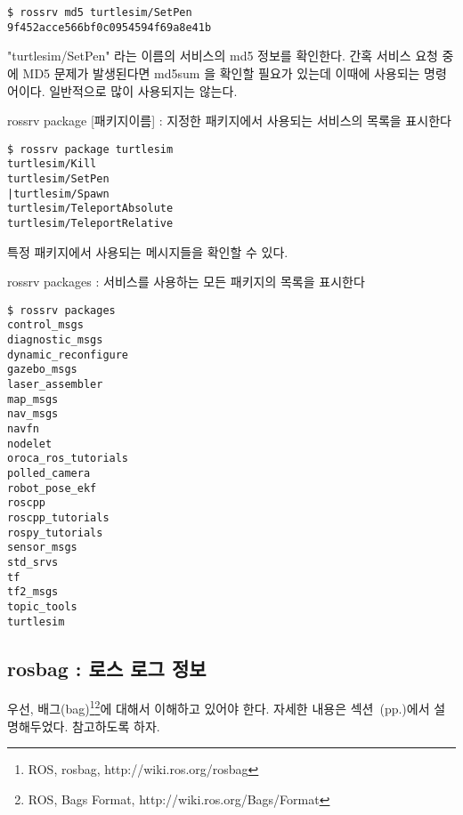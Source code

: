 \begin{lstlisting}[language=ROS]
$ rossrv md5 turtlesim/SetPen 
9f452acce566bf0c0954594f69a8e41b
\end{lstlisting}

\noindent
"turtlesim/SetPen" 라는 이름의 서비스의 md5 정보를 확인한다. 간혹 서비스 요청 중에 MD5 문제가 발생된다면 md5sum 을 확인할 필요가 있는데 이때에 사용되는 명령어이다. 일반적으로 많이 사용되지는 않는다.

\vspace{\baselineskip}
\noindent
{}\circled{\thenum} rossrv package [패키지이름] : 지정한 패키지에서 사용되는 서비스의 목록을 표시한다

\begin{lstlisting}[language=ROS]
$ rossrv package turtlesim 
turtlesim/Kill
turtlesim/SetPen
|turtlesim/Spawn
turtlesim/TeleportAbsolute
turtlesim/TeleportRelative
\end{lstlisting}

\noindent
특정 패키지에서 사용되는 메시지들을 확인할 수 있다.

\vspace{\baselineskip}
\noindent
{}\circled{\thenum} rossrv packages : 서비스를 사용하는 모든 패키지의 목록을 표시한다

\begin{lstlisting}[language=ROS]
$ rossrv packages
control_msgs
diagnostic_msgs
dynamic_reconfigure
gazebo_msgs
laser_assembler
map_msgs
nav_msgs
navfn
nodelet
oroca_ros_tutorials
polled_camera
robot_pose_ekf
roscpp
roscpp_tutorials
rospy_tutorials
sensor_msgs
std_srvs
tf
tf2_msgs
topic_tools
turtlesim
\end{lstlisting}

\subsection{rosbag : 로스 로그 정보}

우선, 배그(bag)\footnote{ROS, rosbag, http://wiki.ros.org/rosbag}\footnote{ROS, Bags Format, http://wiki.ros.org/Bags/Format}에 대해서 이해하고 있어야 한다. 자세한 내용은 섹션~(pp.\pageref{def:RosBag})에서 설명해두었다. 참고하도록 하자.

